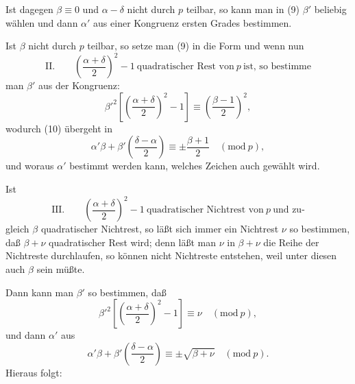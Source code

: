 
Ist dagegen $\beta \equiv 0$ und $\alpha-\delta$ nicht durch $p$ teilbar, so
kann man in (9) $\beta'$ beliebig wählen und dann $\alpha'$ aus einer Kongruenz
 ersten Grades bestimmen.

Ist $\beta$ nicht durch $p$ teilbar, so setze man (9) in die Form
und wenn nun
\[
\text{II.} \qquad \left(\frac{\alpha+\delta}{2}\right)^2-1 \ \text{quadratischer Rest von}\ p \ \text{ist, so bestimme}
\]
man $\beta'$ aus der Kongruenz:
\[
\beta'^2\left[\left(\frac{\alpha+\delta}{2}\right)^2-1\right] \equiv \left(\frac{\beta-1}{2}\right)^2,
\]
wodurch (10) übergeht in
\[
\alpha'\beta+\beta'\left(\frac{\delta-\alpha}{2}\right) \equiv \pm \frac{\beta+1}{2} \quad (\mathrm{mod}\ p),
\]
und woraus $\alpha'$ bestimmt werden kann, welches Zeichen auch
gewählt wird.

Ist
\[
\text{III.} \qquad \left(\frac{\alpha+\delta}{2}\right)^2-1 \ \text{quadratischer Nichtrest von}\ p \ \text{und zu-}
\]
gleich $\beta$ quadratischer Nichtrest, so läßt sich immer ein Nichtrest
 $\nu$ so bestimmen, daß $\beta+\nu$ quadratischer Rest wird; denn
läßt man $\nu$ in $\beta+\nu$ die Reihe der Nichtreste durchlaufen, so
können nicht  Nichtreste entstehen, weil unter diesen
auch $\beta$ sein müßte.

Dann kann man $\beta'$ so bestimmen, daß
\[
\beta'^2\left[\left(\frac{\alpha+\delta}{2}\right)^2-1\right] \equiv \nu \quad (\mathrm{mod}\ p),
\]
und dann $\alpha'$ aus
\[
\alpha'\beta+\beta'\left(\frac{\delta-\alpha}{2}\right) \equiv \pm\sqrt{\beta+\nu} \quad (\mathrm{mod}\ p).
\]
Hieraus folgt:


